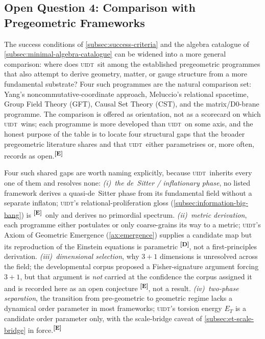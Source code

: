 \documentclass[12pt,a4paper,twoside]{article}
\theoremstyle{plain}
\theoremstyle{definition}
\theoremstyle{remark}
\newcommand{\UIDT}{\textsc{uidt}}
\newcommand{\catmark}[1]{\textsuperscript{\textsf{\textbf{[#1]}}}}
\begin{document}
\subsection{Open Question 4: Comparison with Pregeometric Frameworks}
\label{subsec:oq4-pregeometric}

The success conditions of \cref{subsec:success-criteria} and the algebra catalogue of \cref{subsec:minimal-algebra-catalogue} can be widened into a more general comparison: where does \UIDT\ sit among the established pregeometric programmes that also attempt to derive geometry, matter, or gauge structure from a more fundamental substrate? Four such programmes are the natural comparison set: Yang's noncommutative-coordinate approach, Meluccio's relational spacetime, Group Field Theory (GFT), Causal Set Theory (CST), and the matrix/D0-brane programme. The comparison is offered as orientation, not as a scorecard on which \UIDT\ wins; each programme is more developed than \UIDT\ on some axis, and the honest purpose of the table is to locate four structural gaps that the broader pregeometric literature shares and that \UIDT\ either parametrises or, more often, records as open.\catmark{E}

Four such shared gaps are worth naming explicitly, because \UIDT\ inherits every one of them and resolves none: \emph{(i)~the de~Sitter / inflationary phase}, no listed framework derives a quasi-de~Sitter phase from its fundamental field without a separate inflaton; \UIDT's relational-proliferation gloss (\cref{subsec:information-big-bang}) is \catmark{E}\ only and derives no primordial spectrum. \emph{(ii)~metric derivation}, each programme either postulates or only coarse-grains its way to a metric; \UIDT's Axiom of Geometric Emergence (\cref{ax:emergence}) supplies a candidate map but its reproduction of the Einstein equations is parametric \catmark{D}, not a first-principles derivation. \emph{(iii)~dimensional selection}, why $3+1$ dimensions is unresolved across the field; the developmental corpus proposed a Fisher-signature argument forcing $3+1$, but that argument is \emph{not} carried at the confidence the corpus assigned it and is recorded here as an open conjecture \catmark{E}, not a result. \emph{(iv)~two-phase separation}, the transition from pre-geometric to geometric regime lacks a dynamical order parameter in most frameworks; \UIDT's torsion energy $E_T$ is a candidate order parameter only, with the scale-bridge caveat of \cref{subsec:et-scale-bridge} in force.\catmark{E}
\end{document}
